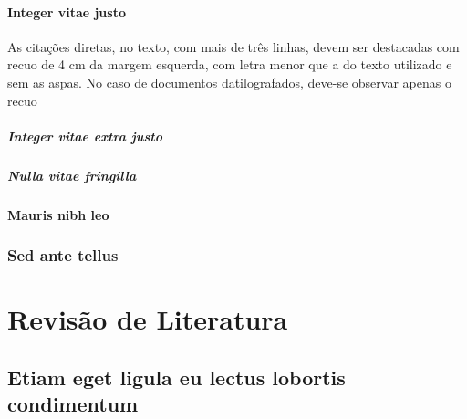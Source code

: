 \documentclass[12pt,openright,twoside,a4paper]{abntex2}
\begin{document}
\lipsum[6-7]

\subsection{Integer vitae justo}

\lipsum[8]

\begin{citacao}
As citações diretas, no texto, com mais de três linhas, devem ser
destacadas com recuo de 4 cm da margem esquerda, com letra menor que a do texto
utilizado e sem as aspas. No caso de documentos datilografados, deve-se
observar apenas o recuo \cite[5.3]{NBR10520:2002}
\end{citacao}

\lipsum[9]

\subsubsection{Integer vitae extra justo}

\lipsum[9-10]

\subsubsection{Nulla vitae fringilla}

\lipsum[11-12]

\subsection{Mauris nibh leo}

\lipsum[12-13]

\section{Sed ante tellus}

\lipsum[14-15]

\part{Revisão de Literatura}

\chapter{Etiam eget ligula eu lectus lobortis condimentum}
\end{document}
